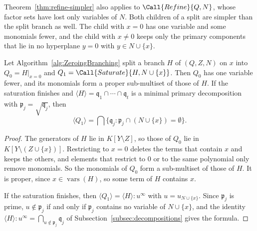 Theorem~\ref{thm:refine-simpler} also applies to $\Call{Refine}{Q,N}$, whose
factor sets have lost only variables of $N$. Both children of a split are
simpler than the split branch as well. The child with $x=0$ has one variable
and some monomials fewer, and the child with $x\neq0$ keeps only the
primary components that lie in no hyperplane $y=0$ with $y\in N\cup\{x\}$.

\begin{theorem}
  \label{thm:zeroing-simpler}
  Let Algorithm~\ref{alg:ZeroingBranching} split a branch $H$ of $(Q,Z,N)$ on
  $x$ into $Q_0=H|_{x=0}$ and $Q_1=\Call{Saturate}{H,N\cup\{x\}}$. Then $Q_0$
  has one variable fewer, and its monomials form a proper sub-multiset of those
  of $H$. If the saturation finishes and
  $\langle H\rangle=\mathfrak q_1\cap\cdots\cap\mathfrak q_t$ is a minimal
  primary decomposition with $\mathfrak p_j=\sqrt{\mathfrak q_j}$, then
  \[
    \langle Q_1\rangle=\bigcap\bigl\{\mathfrak q_j:
    \mathfrak p_j\cap(N\cup\{x\})=\emptyset\bigr\}.
  \]
\end{theorem}

\begin{proof}
  The generators of $H$ lie in $K[Y\setminus Z]$, so those of $Q_0$ lie in
  $K[Y\setminus(Z\cup\{x\})]$. Restricting to $x=0$ deletes the terms that
  contain $x$ and keeps the others, and elements that restrict to $0$ or to the
  same polynomial only remove monomials. So the monomials of $Q_0$ form a
  sub-multiset of those of $H$. It is proper, since
  $x\in\operatorname{vars}(H)$,
  so some term of $H$ contains $x$.

  If the saturation finishes, then
  $\langle Q_1\rangle=\langle H\rangle:u^\infty$ with $u=u_{N\cup\{x\}}$.
  Since $\mathfrak p_j$ is prime,
  $u\notin\mathfrak p_j$ if and only if $\mathfrak p_j$ contains no variable of
  $N\cup\{x\}$, and the identity
  $\langle H\rangle:u^\infty=\bigcap_{u\notin\mathfrak p_j}\mathfrak q_j$ of
  Subsection~\ref{subsec:decompositions} gives the formula.
\end{proof}

